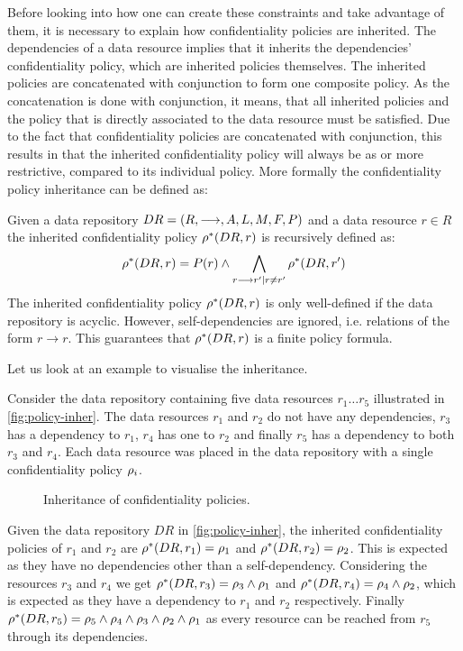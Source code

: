 Before looking into how one can create these constraints and take advantage of them, it is necessary to explain how confidentiality policies are inherited. The dependencies of a data resource implies that it inherits the dependencies' confidentiality policy, which are inherited policies themselves. The inherited policies are concatenated with conjunction to form one composite policy. As the concatenation is done with conjunction, it means, that all inherited policies and the policy that is directly associated to the data resource must be satisfied. Due to the fact that confidentiality policies are concatenated with conjunction, this results in that the inherited confidentiality policy will always be as or more restrictive, compared to its individual policy. More formally the confidentiality policy inheritance can be defined as:
\begin{definition}\label{def:cpi}
Given a data repository $DR= \left( R, \longrightarrow, A, L, M, F, P \right)$ and a data resource $r \in R$ the inherited confidentiality policy $\rho^{\ast}(DR, r)$ is recursively defined as:
\begin{equation*}
    \rho^{\ast}(DR, r) = P(r) \land \bigwedge\limits_{r \longrightarrow r' \mid r \neq r'} \rho^{\ast}(DR, r')
\end{equation*}
The inherited confidentiality policy $\rho^{\ast}(DR, r)$ is only well-defined if the data repository is acyclic. However, self-dependencies are ignored, i.e. relations of the form $r \longrightarrow r$. This guarantees that $\rho^{\ast}(DR, r)$ is a finite policy formula.
\end{definition}

Let us look at an example to visualise the inheritance.
\begin{example}
Consider the data repository containing five data resources $r_1\ldots r_5$ illustrated in \autoref{fig:policy-inher}. The data resources $r_1$ and $r_2$ do not have any dependencies, $r_3$ has a dependency to $r_1$, $r_4$ has one to $r_2$ and finally $r_5$ has a dependency to both $r_3$ and $r_4$. Each data resource was placed in the data repository with a single confidentiality policy $\rho_i$.
\begin{figure}[!ht]
    \begin{center}
        
        \caption{Inheritance of confidentiality policies.}
        \label{fig:policy-inher}
    \end{center}
\end{figure}
Given the data repository $DR$ in \autoref{fig:policy-inher}, the inherited confidentiality policies of $r_1$ and $r_2$ are $\rho^{\ast}(DR, r_1) = \rho_1$ and $\rho^{\ast}(DR, r_2) = \rho_2$. This is expected as they have no dependencies other than a self-dependency. Considering the resources $r_3$ and $r_4$ we get $\rho^{\ast}(DR, r_3) = \rho_3 \land \rho_1$ and $\rho^{\ast}(DR, r_4) = \rho_4 \land \rho_2$, which is expected as they have a dependency to $r_1$ and $r_2$ respectively. Finally $\rho^{\ast}(DR, r_5) = \rho_5 \land \rho_4 \land \rho_3 \land \rho_2 \land \rho_1$ as every resource can be reached from $r_5$ through its dependencies.
\end{example}

